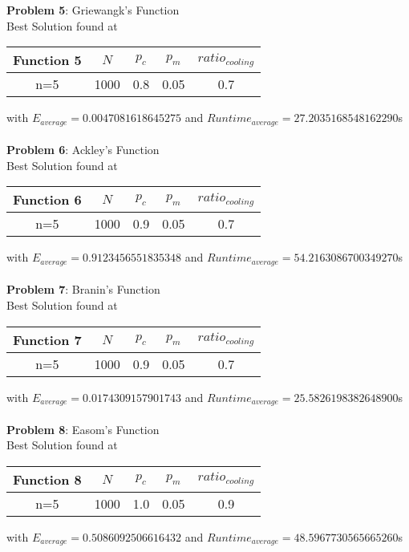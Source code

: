 \documentclass{article}
\begin{document}
\textbf{Problem 5}: Griewangk's Function\\
Best Solution found at\\
\begin{center}
\begin{tabular}{ |c|c|c|c|c| } 
\hline
Function 5 & $N$ & $p_c$ & $p_m$ & $ratio_{cooling}$ \\
\hline
\multirow{1}{3em}{n=5}
& 1000 & 0.8 & 0.05 & 0.7 \\
\hline
\end{tabular}
\end{center}
with $E_{average} = 0.0047081618645275$ and $Runtime_{average} = 27.2035168548162290$s\\\\

\textbf{Problem 6}: Ackley's Function\\
Best Solution found at\\
\begin{center}
\begin{tabular}{ |c|c|c|c|c| } 
\hline
Function 6 & $N$ & $p_c$ & $p_m$ & $ratio_{cooling}$ \\
\hline
\multirow{1}{3em}{n=5}
& 1000 & 0.9 & 0.05 & 0.7 \\
\hline
\end{tabular}
\end{center}
with $E_{average} = 0.9123456551835348$ and $Runtime_{average} = 54.2163086700349270$s\\\\

\textbf{Problem 7}: Branin's Function\\
Best Solution found at\\
\begin{center}
\begin{tabular}{ |c|c|c|c|c| } 
\hline
Function 7 & $N$ & $p_c$ & $p_m$ & $ratio_{cooling}$ \\
\hline
\multirow{1}{3em}{n=5}
& 1000 & 0.9 & 0.05 & 0.7 \\
\hline
\end{tabular}
\end{center}
with $E_{average} = 0.0174309157901743$ and $Runtime_{average} = 25.5826198382648900$s\\\\

\textbf{Problem 8}: Easom's Function\\
Best Solution found at\\
\begin{center}
\begin{tabular}{ |c|c|c|c|c| } 
\hline
Function 8 & $N$ & $p_c$ & $p_m$ & $ratio_{cooling}$ \\
\hline
\multirow{1}{3em}{n=5}
& 1000 & 1.0 & 0.05 & 0.9 \\
\hline
\end{tabular}
\end{center}
with $E_{average} = 0.5086092506616432$ and $Runtime_{average} = 48.5967730565665260$s\\\\
\end{document}

